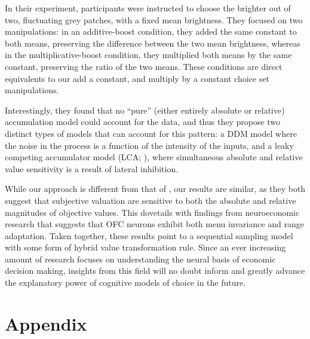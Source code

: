 \documentclass[11pt,a4paper]{article}
\begin{document}
In their experiment, participants were instructed to choose the brighter out of two, fluctuating grey patches, with a fixed mean brightness. They focused on two manipulations: in an additive-boost condition, they added the same constant to both means, preserving the difference between the two mean brightness, whereas in the multiplicative-boost condition, they multiplied both means by the same constant, preserving the ratio of the two means. These conditions are direct equivalents to our add a constant, and multiply by a constant choice set manipulations.

Interestingly, they found that no  ``pure'' (either entirely absolute or relative) accumulation model could account for the data, and thus they propose two distinct types  of models that can account for this pattern: a DDM model where the noise in the process is a function of the intensity of the inputs, and a leaky competing accumulator model (LCA; ), where simultaneous absolute and relative value sensitivity is a result of lateral inhibition. 

While our approach is different from that of , our results are similar, as they both suggest that subjective valuation are sensitive to both the absolute and relative magnitudes of objective values. This dovetails with findings from neuroeconomic research that suggests that OFC neurons exhibit both menu invariance and range adaptation. Taken together, these results point to a sequential sampling model with some form of hybrid value transformation rule. Since an ever increasing amount of research focuses on understanding the neural basis of economic decision making, insights from this field will no doubt inform and greatly advance the explanatory power of cognitive models of choice in the future.



\newpage



\clearpage

\section*{Appendix}
\end{document}
